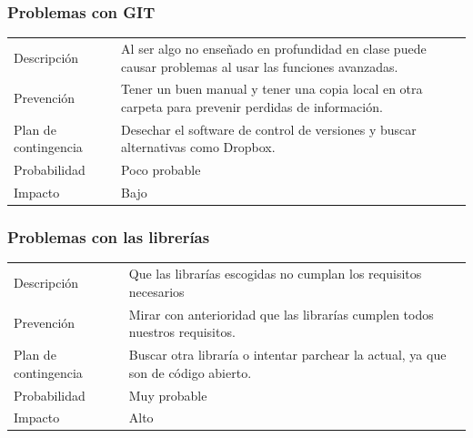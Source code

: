 \subsubsection{Problemas con GIT}

\begin{table}[h]
    \begin{center}
        \begin{tabular}{l p{8cm}}
            Descripci\'{o}n                 & Al ser algo no ense\~{n}ado en profundidad en clase puede causar problemas al usar las
            funciones avanzadas. \\
            Prevenci\'{o}n                  & Tener un buen manual y tener una copia local en otra carpeta para prevenir perdidas de informaci\'{o}n. \\ 
            Plan de contingencia            & Desechar el software de control de versiones y buscar alternativas como Dropbox. \\
            Probabilidad                    & Poco probable \\
            Impacto                         & Bajo \\
        \end{tabular}
    \end{center}
    
\end{table}

\subsubsection{Problemas con las librer\'{i}as}

\begin{table}[h]
    \begin{center}
        \begin{tabular}{l p{8cm}}
            Descripci\'{o}n                 & Que las librar\'{i}as escogidas no cumplan los requisitos necesarios \\
            Prevenci\'{o}n                  & Mirar con anterioridad que las librar\'{i}as cumplen todos nuestros requisitos. \\ 
            Plan de contingencia            & Buscar otra librar\'{i}a o intentar parchear la actual, ya que son de c\'{o}digo abierto. \\
            Probabilidad                    & Muy probable \\
            Impacto                         & Alto \\
        \end{tabular}
    \end{center}
    
\end{table}

